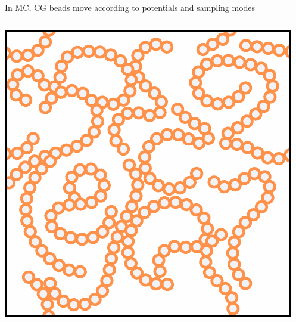 \documentclass[aspectratio=169]{beamer}
\begin{document}
\begin{frame}[t]{In MC, CG beads move according to potentials and sampling modes}
\begin{columns}[T]
    \centering
    \includegraphics[height=0.72\textheight]{../figures/fig-initial_config/fig-initial_config.pdf}

  \end{columns}

\end{frame}

\end{document}
